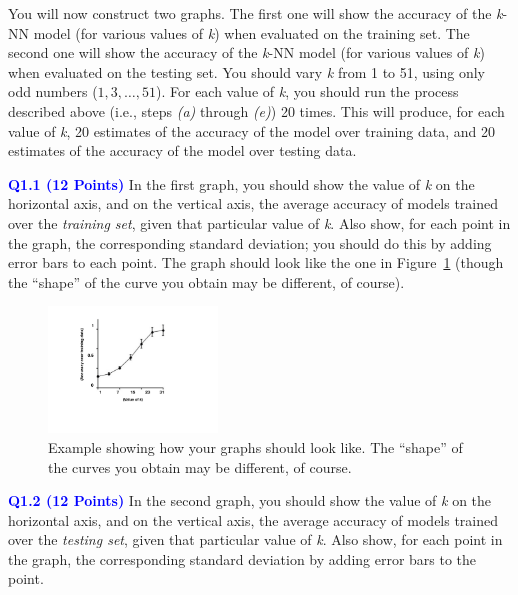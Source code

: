 \documentclass[]{article}
\newcommand{\HIGHLIGHT}[1]{\textcolor{blue}{\textbf{#1}}}
\begin{document}
\begin{enumerate}
    
    \newpage
    You will now construct two graphs. The first one will show the accuracy of the \textit{k}-NN model (for various values of \textit{k}) when evaluated on the training set. The second one will show the accuracy of the \textit{k}-NN model (for various values of \textit{k}) when evaluated on the testing set. You should vary \textit{k} from 1 to 51, using only odd numbers ($1, 3, \ldots, 51$). For each value of \textit{k}, you should run the process described above (i.e., steps \textit{(a)} through \textit{(e)}) 20 times. This will produce, for each value of \textit{k}, 20 estimates of the accuracy of the model over training data, and 20 estimates of the accuracy of the model over testing data. 
    
    \vspace{0.3in}
    
    \HIGHLIGHT{Q1.1 (12 Points)} In the first graph, you should show the value of \textit{k} on the horizontal axis, and on the vertical axis, the average accuracy of models trained over the \textit{training set}, given that particular value of \textit{k}. Also show, for each point in the graph, the corresponding standard deviation; you should do this by adding error bars to each point. The graph should look like the one in Figure~\ref{fig:sample_graph} (though the ``shape'' of the curve you obtain may be different, of course).
    \begin{figure}[ht!]
        \centering
        \includegraphics[width=0.4\textwidth]{figures/example_graph.pdf}
        \caption{Example showing how your graphs should look like. The ``shape'' of the curves you obtain may be different, of course.}
        \label{fig:sample_graph}
    \end{figure}   
    
    
    \HIGHLIGHT{Q1.2 (12 Points)} In the second graph, you should show the value of \textit{k} on the horizontal axis, and on the vertical axis, the average accuracy of models trained over the \textit{testing set}, given that particular value of \textit{k}. Also show, for each point in the graph, the corresponding standard deviation by adding error bars to the point.



\end{enumerate}
\end{document}
